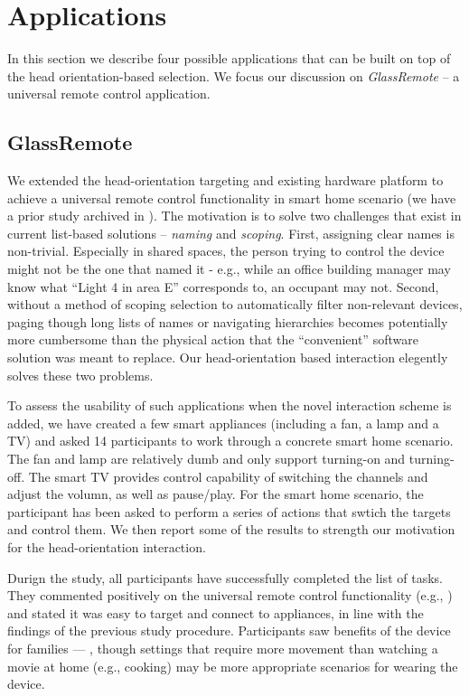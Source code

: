 \section{Applications}
\label{sec:applications}

In this section we describe four possible applications that can be built on top of the head orientation-based selection. We focus our discussion on {\em GlassRemote} -- a universal remote control application.

\subsection{GlassRemote}
\label{sec:univ-remote-contr}

We extended the head-orientation targeting and existing hardware platform to achieve a universal remote control functionality in smart home scenario (we have a prior study archived in \cite{Chen:EECS-2013-200}). The motivation is to solve two challenges that exist in current list-based solutions -- {\em naming} and {\em scoping}. First, assigning clear names is non-trivial. Especially in shared spaces, the person trying to control the device might not be the one that named it - e.g., while an office building manager may know what ``Light 4 in area E'' corresponds to, an occupant may not. Second, without a method of scoping selection to automatically filter non-relevant devices, paging though long lists of names or navigating hierarchies becomes potentially more cumbersome than the physical action that the ``convenient'' software solution was meant to replace. Our head-orientation based interaction elegently solves these two problems.

To assess the usability of such applications when the novel interaction scheme is added, we have created a few smart appliances (including a fan, a lamp and a TV) and asked 14 participants to work through a concrete smart home scenario. The fan and lamp are relatively dumb and only support turning-on and turning-off. The smart TV provides control capability of switching the channels and adjust the volumn, as well as pause/play. For the smart home scenario, the participant has been asked to perform a series of actions that swtich the targets and control them. We then report some of the results to strength our motivation for the head-orientation interaction.

Durign the study, all participants have successfully completed the list of tasks. They commented positively on the universal remote control functionality (e.g., ) and stated it was easy to target and connect to appliances, in line with the findings of the previous study procedure. Participants saw benefits of the device for families --- , though settings that require more movement than watching a movie at home (e.g., cooking) may be more appropriate scenarios for wearing the device.

